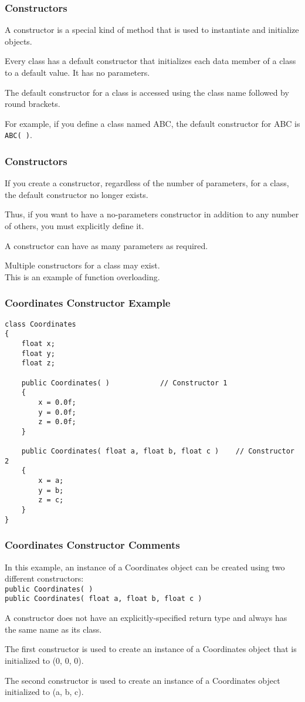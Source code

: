 \begin{frame}
\frametitle{Constructors}

A \alert{constructor} is a special kind of method that is used to instantiate and initialize objects.

Every class has a default constructor that initializes each data member of a class to a default value. It has no parameters.

The default constructor for a class is accessed using the class name followed by round brackets.

For example, if you define a class named ABC, the default constructor for ABC is \texttt{ABC( )}.

\end{frame}

\begin{frame}
\frametitle{Constructors}

If you create a constructor, regardless of the number of parameters, for a class, the default constructor no longer exists.

Thus, if you want to have a no-parameters constructor in addition to any number of others, you must explicitly define it.

A constructor can have as many parameters as required.

Multiple constructors for a class may exist.\\
\quad This is an example of function overloading.

\end{frame}

\begin{frame}[fragile]
\frametitle{Coordinates Constructor Example}

{\scriptsize
\begin{verbatim}
class Coordinates
{
    float x;
    float y;
    float z;

    public Coordinates( )            // Constructor 1
    {
        x = 0.0f; 
        y = 0.0f;
        z = 0.0f;
    }

    public Coordinates( float a, float b, float c )    // Constructor 2
    {
        x = a;
        y = b;
        z = c;
    }    
}
\end{verbatim}
}
\end{frame}

\begin{frame}
\frametitle{Coordinates Constructor Comments}

In this example, an instance of a Coordinates object can be created using two different constructors:\\
\quad \texttt{public Coordinates( )}\\
\quad \texttt{public Coordinates( float a, float b, float c )}

A constructor does not have an explicitly-specified return type and always has the same name as its class.

The first constructor is used to create an instance of a Coordinates object that is initialized to (0, 0, 0).

The second constructor is used to create an instance of a Coordinates object initialized to (a, b, c).

\end{frame}

